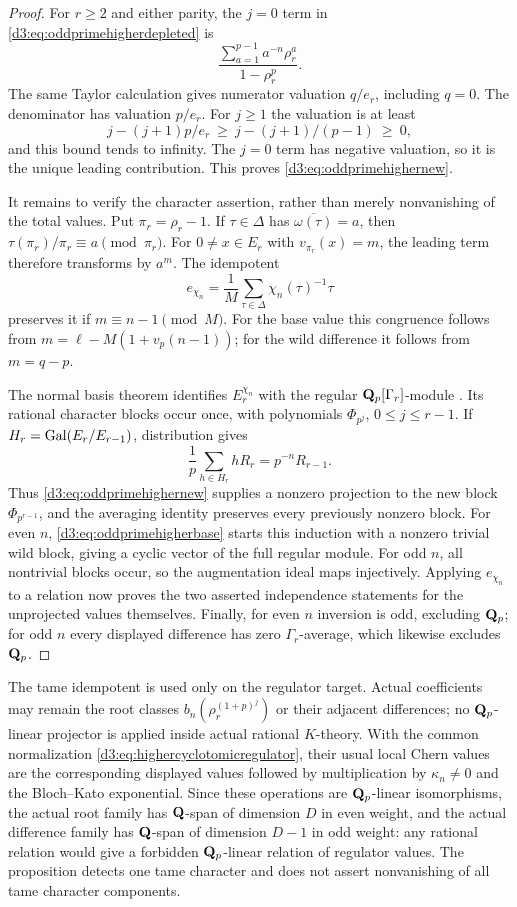 \begin{proof}
For $r\geq2$ and either parity, the $j=0$ term in
\eqref{d3:eq:oddprimehigherdepleted} is
\[
 \frac{\sum_{a=1}^{p-1}a^{-n}\rho_r^a}{1-\rho_r^p}.
\]
The same Taylor calculation gives numerator valuation $q/e_r$,
including $q=0$. The denominator has valuation $p/e_r$.
For $j\geq1$ the valuation is at least
\[
 j-(j+1)p/e_r\ \geq\ j-(j+1)/(p-1)\ \geq\ 0,
\]
and this bound tends to infinity. The $j=0$ term has negative
valuation, so it is the unique leading contribution. This proves
\eqref{d3:eq:oddprimehighernew}.

It remains to verify the character assertion, rather than merely
nonvanishing of the total values. Put $\pi_r=\rho_r-1$.
If $\tau\in\Delta$ has $\overline{\omega(\tau)}=a$, then
$\tau(\pi_r)/\pi_r\equiv a\pmod{\pi_r}$.
For $0\ne x\in E_r$ with $v_{\pi_r}(x)=m$, the leading term
therefore transforms by $a^m$. The idempotent
\[
 e_{\chi_n}=\frac1M\sum_{\tau\in\Delta}\chi_n(\tau)^{-1}\tau
\]
preserves it if $m\equiv n-1\pmod M$.
For the base value this congruence follows from
$m=\ell-M(1+v_p(n-1))$; for the wild difference it follows
from $m=q-p$.

The normal basis theorem identifies $E_r^{\chi_n}$ with the
regular $\mathbf Q_p[\Gamma_r]$-module
\cite[Chapter~I, p.~34]{MilneDuality}. Its rational character blocks
occur once, with polynomials $\Phi_{p^j}$, $0\leq j\leq r-1$.
If $H_r=\operatorname{Gal}(E_r/E_{r-1})$, distribution gives
\[
 \frac1p\sum_{h\in H_r}hR_r=p^{-n}R_{r-1}.
\]
Thus \eqref{d3:eq:oddprimehighernew} supplies a nonzero projection
to the new block $\Phi_{p^{r-1}}$, and the averaging identity
preserves every previously nonzero block.
For even $n$, \eqref{d3:eq:oddprimehigherbase} starts this induction
with a nonzero trivial wild block, giving a cyclic vector of
the full regular module. For odd $n$, all nontrivial blocks
occur, so the augmentation ideal maps injectively.
Applying $e_{\chi_n}$ to a relation now proves the two asserted
independence statements for the unprojected values themselves.
Finally, for even $n$ inversion is odd, excluding $\mathbf Q_p$;
for odd $n$ every displayed difference has zero $\Gamma_r$-average,
which likewise excludes $\mathbf Q_p$.
\end{proof}

\begin{remark}
The tame idempotent is used only on the regulator target.
Actual coefficients may remain the root classes
$b_n(\rho_r^{(1+p)^j})$ or their adjacent differences; no
$\mathbf Q_p$-linear projector is applied inside actual rational
$K$-theory. With the common normalization
\eqref{d3:eq:highercyclotomicregulator}, their usual local Chern
values are the corresponding displayed values followed by
multiplication by $\kappa_n\ne0$ and the Bloch--Kato exponential.
Since these operations are $\mathbf Q_p$-linear isomorphisms, the
actual root family has $\mathbf Q$-span of dimension $D$ in even
weight, and the actual difference family has $\mathbf Q$-span of
dimension $D-1$ in odd weight: any rational relation would
give a forbidden $\mathbf Q_p$-linear relation of regulator values.
The proposition detects one tame character and
does not assert nonvanishing of all tame character components.
\end{remark}

